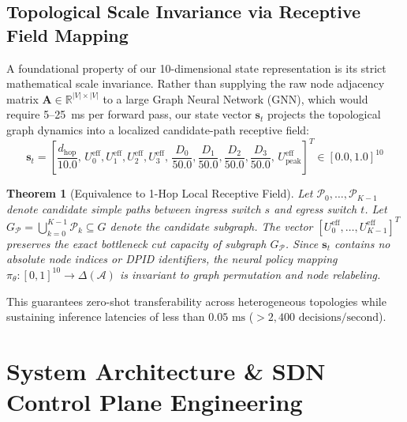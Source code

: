\documentclass[12pt,a4paper,oneside]{report}
\newtheorem{theorem}{Theorem}[chapter]
\begin{document}
\section{Topological Scale Invariance via Receptive Field Mapping}
\label{sec:topological_scale_invariance}
A foundational property of our 10-dimensional state representation is its strict mathematical scale invariance. Rather than supplying the raw node adjacency matrix $\mathbf{A} \in \mathbb{R}^{|V| \times |V|}$ to a large Graph Neural Network (GNN), which would require 5--25~ms per forward pass, our state vector $\mathbf{s}_t$ projects the topological graph dynamics into a localized candidate-path receptive field:
\begin{equation}
    \mathbf{s}_t = \left[ \frac{d_{\text{hop}}}{10.0}, \, U_0^{\text{eff}}, U_1^{\text{eff}}, U_2^{\text{eff}}, U_3^{\text{eff}}, \, \frac{D_0}{50.0}, \frac{D_1}{50.0}, \frac{D_2}{50.0}, \frac{D_3}{50.0}, \, U_{\text{peak}}^{\text{eff}} \right]^T \in [0.0, 1.0]^{10}
\end{equation}
\begin{theorem}[Equivalence to 1-Hop Local Receptive Field]
Let $\mathcal{P}_0, \dots, \mathcal{P}_{K-1}$ denote candidate simple paths between ingress switch $s$ and egress switch $t$. Let $G_{\mathcal{P}} = \bigcup_{k=0}^{K-1} \mathcal{P}_k \subseteq G$ denote the candidate subgraph. The vector $[U_0^{\text{eff}}, \dots, U_{K-1}^{\text{eff}}]^T$ preserves the exact bottleneck cut capacity of subgraph $G_{\mathcal{P}}$. Since $\mathbf{s}_t$ contains no absolute node indices or DPID identifiers, the neural policy mapping $\pi_\theta: [0, 1]^{10} \to \Delta(\mathcal{A})$ is invariant to graph permutation and node relabeling.
\end{theorem}
This guarantees zero-shot transferability across heterogeneous topologies while sustaining inference latencies of less than $0.05\text{ ms}$ ($> 2,400\text{ decisions/second}$).


\chapter{System Architecture \& SDN Control Plane Engineering}
\label{chap:architecture}
\end{document}
